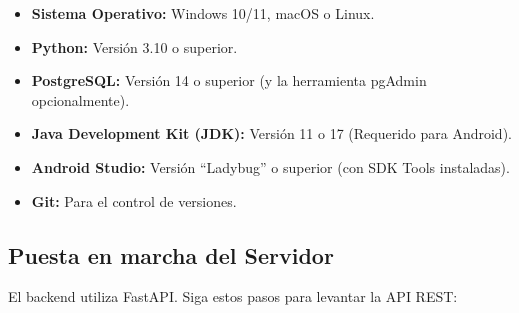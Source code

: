 \begin{itemize}
    \item \textbf{Sistema Operativo:} Windows 10/11, macOS o Linux.
    \item \textbf{Python:} Versión 3.10 o superior.
    \item \textbf{PostgreSQL:} Versión 14 o superior (y la herramienta pgAdmin opcionalmente).
    \item \textbf{Java Development Kit (JDK):} Versión 11 o 17 (Requerido para Android).
    \item \textbf{Android Studio:} Versión ``Ladybug'' o superior (con SDK Tools instaladas).
    \item \textbf{Git:} Para el control de versiones.
\end{itemize}

\subsection{Puesta en marcha del Servidor}
El backend utiliza FastAPI. Siga estos pasos para levantar la API REST:

